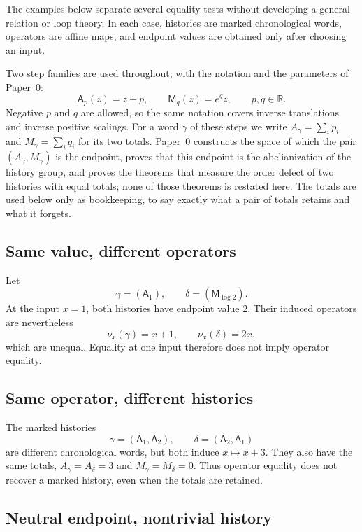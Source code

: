 The examples below separate several equality tests without developing a general
relation or loop theory.  In each case, histories are marked chronological
words, operators are affine maps, and endpoint values are obtained only after
choosing an input.

Two step families are used throughout, with the notation and the parameters
of Paper~0:
\[
  \mathsf A_p(z)=z+p,
  \qquad
  \mathsf M_q(z)=e^{q}z,
  \qquad p,q\in\mathbb R .
\]
Negative \(p\) and \(q\) are allowed, so the same notation covers inverse
translations and inverse positive scalings.  For a word \(\gamma\) of these
steps we write \(A_\gamma=\sum_i p_i\) and \(M_\gamma=\sum_i q_i\) for its
two totals.  Paper~0 constructs the space of which the pair
\((A_\gamma,M_\gamma)\) is the endpoint, proves that this endpoint is the
abelianization of the history group, and proves the theorems that measure the
order defect of two histories with equal totals; none of those theorems is
restated here.  The totals are used below only as bookkeeping, to say exactly
what a pair of totals retains and what it forgets.

\subsection{Same value, different operators}

Let
\[
    \gamma=(\mathsf A_1),
    \qquad
    \delta=(\mathsf M_{\log 2}).
\]
At the input \(x=1\), both histories have endpoint value \(2\).  Their induced
operators are nevertheless
\[
    \nu_x(\gamma)=x+1,
    \qquad
    \nu_x(\delta)=2x,
\]
which are unequal.  Equality at one input therefore does not imply operator
equality.

\subsection{Same operator, different histories}

The marked histories
\[
    \gamma=(\mathsf A_1,\mathsf A_2),
    \qquad
    \delta=(\mathsf A_2,\mathsf A_1)
\]
are different chronological words, but both induce \(x\mapsto x+3\).  They
also have the same totals, \(A_\gamma=A_\delta=3\) and
\(M_\gamma=M_\delta=0\).  Thus operator equality does not recover a marked
history, even when the totals are retained.

\subsection{Neutral endpoint, nontrivial history}

